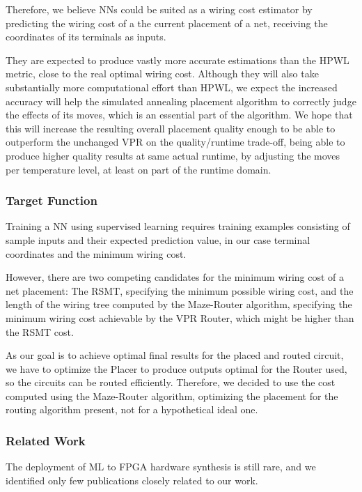 Therefore, we believe \glspl{NN} could be suited as a wiring cost estimator by predicting the wiring cost of a the current placement of a net, receiving the coordinates of its terminals as inputs. 

They are expected to produce vastly more accurate estimations than the \gls{HPWL} metric, close to the real optimal wiring cost. Although they will also take substantially more computational effort than \gls{HPWL}, we expect the increased accuracy will help the simulated annealing placement algorithm to correctly judge the effects of its moves, which is an essential part of the algorithm. We hope that this will increase the resulting overall placement quality enough to be able to outperform the unchanged \gls{VPR} on the quality/runtime trade-off, being able to produce higher quality results at same actual runtime, by adjusting the moves per temperature level, at least on part of the runtime domain.

\subsubsection{Target Function}

Training a \gls{NN} using supervised learning requires training examples consisting of sample inputs and their expected prediction value, in our case terminal coordinates and the minimum wiring cost.

However, there are two competing candidates for the minimum wiring cost of a net placement: The \gls{RSMT}, specifying the minimum possible wiring cost, and the length of the wiring tree computed by the Maze-Router algorithm\cite{Maze-Router}, specifying the minimum wiring cost achievable by the \gls{VPR} Router, which might be higher than the \gls{RSMT} cost.

As our goal is to achieve optimal final results for the placed and routed circuit, we have to optimize the Placer to produce outputs optimal for the Router used, so the circuits can be routed efficiently. Therefore, we decided to use the cost computed using the Maze-Router algorithm, optimizing the placement for the routing algorithm present, not for a hypothetical ideal one.

\subsubsection{Related Work}

The deployment of \gls{ML} to \gls{FPGA} hardware synthesis is still rare\cite{routability-estimator}, and we identified only few publications closely related to our work. 

